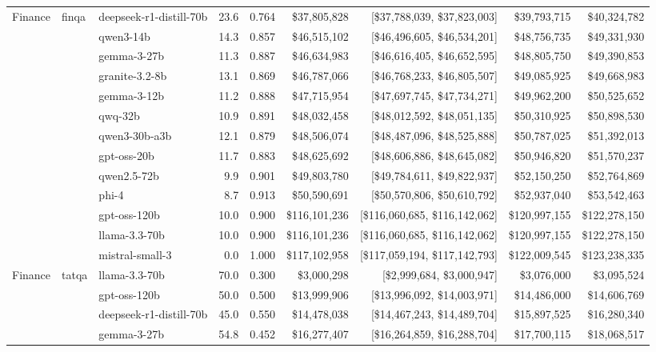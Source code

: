 \begin{table}[t]
\begin{tabular}{lllrrrrrr}
\midrule
  Finance & finqa & deepseek-r1-distill-70b & 23.6 & 0.764 & \$37,805,828 & [\$37,788,039, \$37,823,003] & \$39,793,715 & \$40,324,782 \\
   &  & qwen3-14b & 14.3 & 0.857 & \$46,515,102 & [\$46,496,605, \$46,534,201] & \$48,756,735 & \$49,331,930 \\
   &  & gemma-3-27b & 11.3 & 0.887 & \$46,634,983 & [\$46,616,405, \$46,652,595] & \$48,805,750 & \$49,390,853 \\
   &  & granite-3.2-8b & 13.1 & 0.869 & \$46,787,066 & [\$46,768,233, \$46,805,507] & \$49,085,925 & \$49,668,983 \\
   &  & gemma-3-12b & 11.2 & 0.888 & \$47,715,954 & [\$47,697,745, \$47,734,271] & \$49,962,200 & \$50,525,652 \\
   &  & qwq-32b & 10.9 & 0.891 & \$48,032,458 & [\$48,012,592, \$48,051,135] & \$50,310,925 & \$50,898,530 \\
   &  & qwen3-30b-a3b & 12.1 & 0.879 & \$48,506,074 & [\$48,487,096, \$48,525,888] & \$50,787,025 & \$51,392,013 \\
   &  & gpt-oss-20b & 11.7 & 0.883 & \$48,625,692 & [\$48,606,886, \$48,645,082] & \$50,946,820 & \$51,570,237 \\
   &  & qwen2.5-72b & 9.9 & 0.901 & \$49,803,780 & [\$49,784,611, \$49,822,937] & \$52,150,250 & \$52,764,869 \\
   &  & phi-4 & 8.7 & 0.913 & \$50,590,691 & [\$50,570,806, \$50,610,792] & \$52,937,040 & \$53,542,463 \\
   &  & gpt-oss-120b & 10.0 & 0.900 & \$116,101,236 & [\$116,060,685, \$116,142,062] & \$120,997,155 & \$122,278,150 \\
   &  & llama-3.3-70b & 10.0 & 0.900 & \$116,101,236 & [\$116,060,685, \$116,142,062] & \$120,997,155 & \$122,278,150 \\
   &  & mistral-small-3 & 0.0 & 1.000 & \$117,102,958 & [\$117,059,194, \$117,142,793] & \$122,009,545 & \$123,238,335 \\
\midrule
  Finance & tatqa & llama-3.3-70b & 70.0 & 0.300 & \$3,000,298 & [\$2,999,684, \$3,000,947] & \$3,076,000 & \$3,095,524 \\
   &  & gpt-oss-120b & 50.0 & 0.500 & \$13,999,906 & [\$13,996,092, \$14,003,971] & \$14,486,000 & \$14,606,769 \\
   &  & deepseek-r1-distill-70b & 45.0 & 0.550 & \$14,478,038 & [\$14,467,243, \$14,489,704] & \$15,897,525 & \$16,280,340 \\
   &  & gemma-3-27b & 54.8 & 0.452 & \$16,277,407 & [\$16,264,859, \$16,288,704] & \$17,700,115 & \$18,068,517 \\

\end{tabular}
\end{table}
